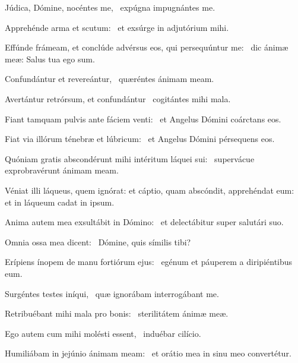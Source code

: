 \item Júdica, Dómine, nocéntes me,~\psstar{} expúgna impugnántes me.

\item Apprehénde arma et scutum:~\psstar{} et exsúrge in adjutórium mihi.

\item Effúnde frámeam, et conclúde advérsus eos, qui persequúntur me:~\psstar{} dic ánimæ meæ: Salus tua ego sum.

\item Confundántur et revereántur,~\psstar{} quæréntes ánimam meam.

\item Avertántur retrórsum, et confundántur~\psstar{} cogitántes mihi mala.

\item Fiant tamquam pulvis ante fáciem venti:~\psstar{} et Angelus Dómini coárctans eos.

\item Fiat via illórum ténebræ et lúbricum:~\psstar{} et Angelus Dómini pérsequens eos.

\item Quóniam gratis abscondérunt mihi intéritum láquei sui:~\psstar{} supervácue exprobravérunt ánimam meam.

\item Véniat illi láqueus, quem ignórat: et cáptio, quam abscóndit, apprehéndat eum:~\psstar{} et in láqueum cadat in ipsum.

\item Anima autem mea exsultábit in Dómino:~\psstar{} et delectábitur super salutári suo.

\item Omnia ossa mea dicent:~\psstar{} Dómine, quis símilis tibi?

\item Erípiens ínopem de manu fortiórum ejus:~\psstar{} egénum et páuperem a diripiéntibus eum.

\item Surgéntes testes iníqui,~\psstar{} quæ ignorábam interrogábant me.

\item Retribuébant mihi mala pro bonis:~\psstar{} sterilitátem ánimæ meæ.

\item Ego autem cum mihi molésti essent,~\psstar{} induébar cilício.

\item Humiliábam in jejúnio ánimam meam:~\psstar{} et orátio mea in sinu meo convertétur.

